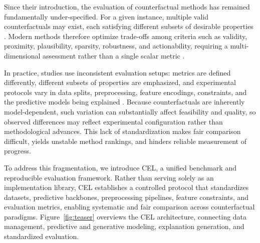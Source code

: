 \documentclass[runningheads]{llncs}
\begin{document}


Since their introduction, the evaluation of counterfactual methods has remained fundamentally under-specified. For a given instance, multiple valid counterfactuals may exist, each satisfying different subsets of desirable properties \cite{mothilal2020explaining}. Modern methods therefore optimize trade-offs among criteria such as validity, proximity, plausibility, sparsity, robustness, and actionability, requiring a multi-dimensional assessment rather than a single scalar metric \cite{guidotti2024counterfactual}.

In practice, studies use inconsistent evaluation setups: metrics are defined differently, different subsets of properties are emphasized, and experimental protocols vary in data splits, preprocessing, feature encodings, constraints, and the predictive models being explained \cite{de2021framework,pineau2021improving}. Because counterfactuals are inherently model-dependent, such variation can substantially affect feasibility and quality, so observed differences may reflect experimental configuration rather than methodological advances. This lack of standardization makes fair comparison difficult, yields unstable method rankings, and hinders reliable measurement of progress.

To address this fragmentation, we introduce CEL, a unified benchmark and reproducible evaluation framework. Rather than serving solely as an implementation library, CEL establishes a controlled protocol that standardizes datasets, predictive backbones, preprocessing pipelines, feature constraints, and evaluation metrics, enabling systematic and fair comparison across counterfactual paradigms. Figure~\ref{fig:teaser} overviews the CEL architecture, connecting data management, predictive and generative modeling, explanation generation, and standardized evaluation.
\end{document}
